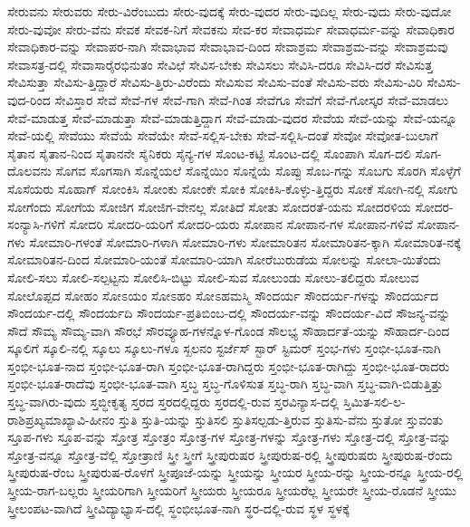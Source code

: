 {ಸೇರುವನು
ಸೇರುವರು
ಸೇರು-ವಿರೆಂಬುದು
ಸೇರು-ವುದಕ್ಕೆ
ಸೇರು-ವುದರ
ಸೇರು-ವುದಿಲ್ಲ
ಸೇರು-ವುದು
ಸೇರು-ವುದೋ
ಸೇರು-ವುವೋ
ಸೇರು-ವೆನು
ಸೇವಕ
ಸೇವಕ-ನಿಗೆ
ಸೇವಕನು
ಸೇವ-ಕರ
ಸೇವಾಧರ್ಮ
ಸೇವಾಧರ್ಮ-ವನ್ನು
ಸೇವಾಧಿಕಾರ
ಸೇವಾಧಿಕಾರ-ವನ್ನು
ಸೇವಾಪರ-ನಾಗಿ
ಸೇವಾಭಾವ
ಸೇವಾಭಾವ-ದಿಂದ
ಸೇವಾಶ್ರಮ
ಸೇವಾಶ್ರಮ-ವನ್ನು
ಸೇವಾಶ್ರಮವು
ಸೇವಾಸತ್ರ-ದಲ್ಲಿ
ಸೇವಾಸಾರೈರಭಿನುತಂ
ಸೇವಿಛೆ
ಸೇವಿಸ-ಬೇಕು
ಸೇವಿಸಲು
ಸೇವಿಸಿ-ದರೂ
ಸೇವಿಸಿ-ದರೆ
ಸೇವಿಸುತ್ತ
ಸೇವಿಸುತ್ತಾ
ಸೇವಿಸು-ತ್ತಿದ್ದಾರೆ
ಸೇವಿಸು-ತ್ತಿರು-ವಿರೆಂದು
ಸೇವಿಸುವ
ಸೇವಿಸು-ವಂತೆ
ಸೇವಿಸು-ವರು
ಸೇವಿಸು-ವಿರಿ
ಸೇವಿಸು-ವುದ-ರಿಂದ
ಸೇವಿಸ್ತಾರ
ಸೇವೆ
ಸೇವೆ-ಗಳ
ಸೇವೆ-ಗಾಗಿ
ಸೇವೆ-ಗಿಂತ
ಸೇವೆಗೂ
ಸೇವೆಗೆ
ಸೇವೆ-ಗೋಸ್ಕರ
ಸೇವೆ-ಮಾಡಲು
ಸೇವೆ-ಮಾಡುತ್ತ
ಸೇವೆ-ಮಾಡುತ್ತಾ
ಸೇವೆ-ಮಾಡುತ್ತಿದ್ದಾಗ
ಸೇವೆ-ಮಾಡು-ವುದರ
ಸೇವೆಯ
ಸೇವೆ-ಯನ್ನು
ಸೇವೆ-ಯನ್ನೂ
ಸೇವೆ-ಯಲ್ಲಿ
ಸೇವೆಯು
ಸೇವೆಯೆ
ಸೇವೆಯೇ
ಸೇವೆ-ಸಲ್ಲಿಸ-ಬೇಕು
ಸೇವೆ-ಸಲ್ಲಿಸಿ-ದಂತೆ
ಸೇವೋ
ಸೇವೋತ-ಬುಲಾಗೆ
ಸೈತಾನ
ಸೈತಾನ-ನಿಂದ
ಸೈತಾನನೇ
ಸೈನಿಕರು
ಸೈನ್ಯ-ಗಳ
ಸೊಂಟ-ಕಟ್ಟಿ
ಸೊಂಟ-ದಲ್ಲಿ
ಸೊಂಪಾಗಿ
ಸೊಗ-ದಲಿ
ಸೊಗ-ದೊಲವನು
ಸೊಗವ
ಸೊಗಸಾಗಿ
ಸೊನ್ನೆಯಲೆ
ಸೊನ್ನೆಯಿಂ
ಸೊನ್ನೆಯೆ
ಸೊಪ್ಪು
ಸೊಬ-ಗನ್ನು
ಸೊಬಗು
ಸೊರಗಿ
ಸೊಳ್ಳೆಗೆ
ಸೊಸೆಯರು
ಸೊಹಾಗ್
ಸೋಂಕಿಸಿ
ಸೋಂಕು
ಸೋಂಕೇ
ಸೋಕಿ
ಸೋಕಿಸಿ-ಕೊಳ್ಳು-ತ್ತಿದ್ದರು
ಸೋಕೆ
ಸೋಗಿ-ನಲ್ಲಿ
ಸೋಗು
ಸೋಗೆಂದು
ಸೋಗೆಯ
ಸೋಜಿಗ
ಸೋಜಿಗ-ವೇನಲ್ಲ
ಸೋತಿದೆ
ಸೋತು
ಸೋದರತೆ-ಯನು
ಸೋದರಳಿಯ
ಸೋದರ-ಸಂನ್ಯಾಸಿ-ಗಳಿಗೆ
ಸೋದರಿ
ಸೋದರಿ-ಯರಿಗೆ
ಸೋದರಿ-ಯರು
ಸೋಪಾನ
ಸೋಪಾನ-ಗಳ
ಸೋಪಾನ-ಗಳಿವೆ
ಸೋಪಾನ-ಗಳು
ಸೋಮಾರಿ-ಗಳಂತೆ
ಸೋಮಾರಿ-ಗಳಾಗಿ
ಸೋಮಾರಿ-ಗಳು
ಸೋಮಾರಿತನ
ಸೋಮಾರಿತನ-ಕ್ಕಾಗಿ
ಸೋಮಾರಿತ-ನಕ್ಕೆ
ಸೋಮಾರಿತನ-ದಿಂದ
ಸೋಮಾರಿ-ಯಂತೆ
ಸೋಮಾರಿ-ಯಾಗಿ
ಸೋರೆಬುರುಡೆಯ
ಸೋಲನ್ನು
ಸೋಲಾ-ಯಿತೆಂದು
ಸೋಲಿ-ಸಲು
ಸೋಲಿ-ಸಲ್ಪಟ್ಟನು
ಸೋಲಿಸಿ-ಬಿಟ್ಟು
ಸೋಲಿ-ಸುವ
ಸೋಲುಂಡು
ಸೋಲು-ತಲಿದ್ದರು
ಸೋಲುವ
ಸೋಲೊಪ್ಪದ
ಸೋಹಂ
ಸೋಽಯಂ
ಸೋಽಹಂ
ಸೋಽಹಮಸ್ಮಿ
ಸೌಂದರ್ಯ
ಸೌಂದರ್ಯ-ಗಳನ್ನು
ಸೌಂದರ್ಯದ
ಸೌಂದರ್ಯ-ದಲ್ಲಿ
ಸೌಂದರ್ಯದಿ
ಸೌಂದರ್ಯ-ಪ್ರತಿಬಿಂಬ-ದಲ್ಲಿ
ಸೌಂದರ್ಯ-ವನ್ನು
ಸೌಂದರ್ಯ-ವಿದೆ
ಸೌಜನ್ಯ-ವನ್ನು
ಸೌದೆ
ಸೌಮ್ಯ
ಸೌಮ್ಯ-ವಾಗಿ
ಸೌರಭೆ
ಸೌರವ್ಯೂಹ-ಗಳನ್ನೊಳ-ಗೊಂಡ
ಸೌಲಭ್ಯ
ಸೌಹಾರ್ದತೆ-ಯನ್ನು
ಸೌಹಾರ್ದ-ದಿಂದ
ಸ್ಕೂಲಿಗೆ
ಸ್ಕೂಲಿ-ನಲ್ಲಿ
ಸ್ಕೂಲು
ಸ್ಕೂಲು-ಗಳೂ
ಸ್ಖಲನಂ
ಸ್ಟರ್ಜೆಸ್
ಸ್ಟಾರ್
ಸ್ಟಿಮರ್
ಸ್ತಂಭ-ಗಳು
ಸ್ತಂಭೀ-ಭೂತ-ನಾಗಿ
ಸ್ತಂಭೀ-ಭೂತ-ನಾದ
ಸ್ತಂಭೀ-ಭೂತ-ರಾಗಿ
ಸ್ತಂಭೀ-ಭೂತ-ರಾಗಿದ್ದರು
ಸ್ತಂಭೀ-ಭೂತ-ರಾಗಿದ್ದು
ಸ್ತಂಭೀ-ಭೂತ-ರಾದರು
ಸ್ತಂಭೀ-ಭೂತ-ರಾದೆವು
ಸ್ತಂಭೀ-ಭೂತ-ವಾಗಿ
ಸ್ತಬ್ಧ
ಸ್ತಬ್ಧ-ಗೊಳಿಸುತ
ಸ್ತಬ್ಧ-ರಾಗಿ
ಸ್ತಬ್ಧ-ವಾಗಿ
ಸ್ತಬ್ಧ-ವಾಗಿ-ಬಿಡುತ್ತಿತ್ತು
ಸ್ತಬ್ಧ-ವಾಗಿರು-ವುದು
ಸ್ತಬ್ಧೀಕೃತ್ಯ
ಸ್ತರದ
ಸ್ತರದಲ್ಲಿದ್ದರು
ಸ್ತರದಲ್ಲಿ-ರುವ
ಸ್ತರವಿನ್ಯಾಸ-ದಲ್ಲಿ
ಸ್ತಿಮಿತ-ಸಲಿ-ಲ-ರಾಶಿಪ್ರಖ್ಯಮಾಖ್ಯಾವಿ-ಹೀನಂ
ಸ್ತುತಿ
ಸ್ತುತಿ-ಯನ್ನು
ಸ್ತುತಿಸಲಿ
ಸ್ತುತಿಸಲ್ಪಡು-ತ್ತಿರುವ
ಸ್ತುತಿಸು-ವೆನು
ಸ್ತುತೋ
ಸ್ತುವಂತು
ಸ್ತೂಪ-ಗಳು
ಸ್ತೂಪ-ವನ್ನು
ಸ್ತೋತ್ರ
ಸ್ತೋತ್ರಂ
ಸ್ತೋತ್ರ-ಗಳ
ಸ್ತೋತ್ರ-ಗಳನ್ನು
ಸ್ತೋತ್ರ-ಗಳು
ಸ್ತೋತ್ರ-ದಲ್ಲಿ
ಸ್ತೋತ್ರ-ವನ್ನು
ಸ್ತೋತ್ರ-ವನ್ನೂ
ಸ್ತೋತ್ರ-ವೆಲ್ಲಿ
ಸ್ತೋತ್ರಾಣಿ
ಸ್ತ್ರೀ
ಸ್ತ್ರೀಗೆ
ಸ್ತ್ರೀಪುರುಷರ
ಸ್ತ್ರೀಪುರುಷ-ರಲ್ಲಿ
ಸ್ತ್ರೀಪುರುಷರು
ಸ್ತ್ರೀಪುರುಷ-ರೆಂದು
ಸ್ತ್ರೀಪುರುಷ-ರೆಂಬ
ಸ್ತ್ರೀಪುರುಷ-ರೊಳಗೆ
ಸ್ತ್ರೀಪೂಜೆ-ಯನ್ನು
ಸ್ತ್ರೀಯನ್ನು
ಸ್ತ್ರೀಯರ
ಸ್ತ್ರೀಯ-ರನ್ನು
ಸ್ತ್ರೀಯ-ರನ್ನೂ
ಸ್ತ್ರೀಯ-ರಲ್ಲಿ
ಸ್ತ್ರೀಯ-ರಾಗ-ಬಲ್ಲರು
ಸ್ತ್ರೀಯರಿಗಾಗಿ
ಸ್ತ್ರೀಯರಿಗೆ
ಸ್ತ್ರೀಯರು
ಸ್ತ್ರೀಯರೂ
ಸ್ತ್ರೀಯರೆಲ್ಲ
ಸ್ತ್ರೀಯರೇ
ಸ್ತ್ರೀಯ-ರೊಡನೆ
ಸ್ತ್ರೀಯು
ಸ್ತ್ರೀಲಂಪಟ-ವಾಗಿದೆ
ಸ್ತ್ರೀವಿದ್ಯಾಭ್ಯಾಸ-ದಲ್ಲಿ
ಸ್ಥಂಭೀಭೂತ-ನಾಗಿ
ಸ್ಥರ-ದಲ್ಲಿ-ರುವ
ಸ್ಥಳ
ಸ್ಥಳಕ್ಕೆ
}
